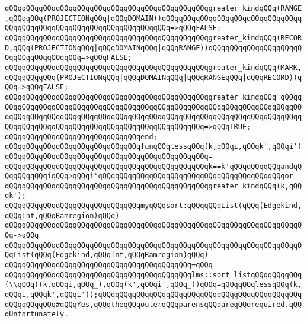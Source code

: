 \verb|qQQqqQQqqQQqqQQqqQQqqQQqqQQqqQQqqQQqqQQqqQQqqQQqgreater_kindqQQq(RANGE,qQQqqQQq(PROJECTIONqQQq|\verb#|qQQqDOMAIN))qQQqqQQqqQQqqQQqqQQqqQQqqQQqqQQqqQQqqQQqqQQqqQQqqQQqqQQqqQQqqQQqqQQqqQQq=>qQQqFALSE;#\newline
\verb|qQQqqQQqqQQqqQQqqQQqqQQqqQQqqQQqqQQqqQQqqQQqqQQqgreater_kindqQQq(RECORD,qQQq(PROJECTIONqQQq|\verb#|qQQqDOMAINqQQq|qQQqRANGE))qQQqqQQqqQQqqQQqqQQqqQQqqQQqqQQqqQQqqQQq=>qQQqFALSE;#\newline
\verb|qQQqqQQqqQQqqQQqqQQqqQQqqQQqqQQqqQQqqQQqqQQqqQQqgreater_kindqQQq(MARK,qQQqqQQqqQQq(PROJECTIONqQQq|\verb#|qQQqDOMAINqQQq|qQQqRANGEqQQq|qQQqRECORD))qQQq=>qQQqFALSE;#\newline
\verb|qQQqqQQqqQQqqQQqqQQqqQQqqQQqqQQqqQQqqQQqqQQqqQQqgreater_kindqQQq_qQQqqQQqqQQqqQQqqQQqqQQqqQQqqQQqqQQqqQQqqQQqqQQqqQQqqQQqqQQqqQQqqQQqqQQqqQQqqQQqqQQqqQQqqQQqqQQqqQQqqQQqqQQqqQQqqQQqqQQqqQQqqQQqqQQqqQQqqQQqqQQqqQQqqQQqqQQqqQQqqQQqqQQqqQQqqQQqqQQqqQQqqQQqqQQq=>qQQqTRUE;|\newline
\verb|qQQqqQQqqQQqqQQqqQQqqQQqqQQqqQQqend;|\newline
\newline
\verb|qQQqqQQqqQQqqQQqqQQqqQQqqQQqqQQqfunqQQqlessqQQq(k,qQQqi,qQQqk',qQQqi')|\newline
\verb|qQQqqQQqqQQqqQQqqQQqqQQqqQQqqQQqqQQqqQQqqQQqqQQq=|\newline
\verb|qQQqqQQqqQQqqQQqqQQqqQQqqQQqqQQqqQQqqQQqqQQqqQQqk==k'qQQqqQQqqQQqandqQQqqQQqqQQqiqQQq>qQQqi'qQQqqQQqqQQqqQQqqQQqqQQqqQQqqQQqqQQqqQQqqQQqor|\newline
\verb|qQQqqQQqqQQqqQQqqQQqqQQqqQQqqQQqqQQqqQQqqQQqqQQqgreater_kindqQQq(k,qQQqk');|\newline
\newline
\verb|qQQqqQQqqQQqqQQqqQQqqQQqqQQqqQQqmyqQQqsort:qQQqqQQqList(qQQq(Edgekind,qQQqInt,qQQqRamregion)qQQq)|\newline
\verb|qQQqqQQqqQQqqQQqqQQqqQQqqQQqqQQqqQQqqQQqqQQqqQQqqQQqqQQqqQQqqQQqqQQqqQQq->qQQq|\newline
\verb|qQQqqQQqqQQqqQQqqQQqqQQqqQQqqQQqqQQqqQQqqQQqqQQqqQQqqQQqqQQqqQQqqQQqqQQqList(qQQq(Edgekind,qQQqInt,qQQqRamregion)qQQq)|\newline
\verb|qQQqqQQqqQQqqQQqqQQqqQQqqQQqqQQqqQQqqQQqqQQq=qQQq|\newline
\verb|qQQqqQQqqQQqqQQqqQQqqQQqqQQqqQQqqQQqqQQqqQQqlms::sort_listqQQqqQQqqQQq(\\qQQq((k,qQQqi,qQQq_),qQQq(k',qQQqi',qQQq_))qQQq=qQQqqQQqlessqQQq(k,qQQqi,qQQqk',qQQqi'));qQQqqQQqqQQqqQQqqQQqqQQqqQQqqQQqqQQqqQQqqQQqqQQqqQQqqQQqqQQq#qQQqYes,qQQqtheqQQqouterqQQqparensqQQqareqQQqrequired.qQQqUnfortunately.|\newline

